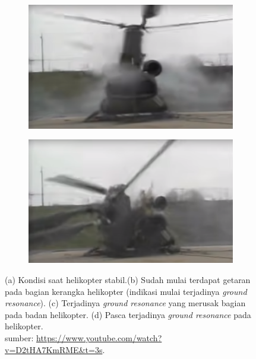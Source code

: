 \begin{figure}[H]
	\begin{subfigure}{0.4\textwidth}
		\centering
		\includegraphics[width=\linewidth]{gambar/gr_3.png}
		\caption{}
		\label{fig:gr_3}
	\end{subfigure}
	\centering
	\begin{subfigure}{0.4\textwidth}
		\centering
		\includegraphics[width=\linewidth]{gambar/gr_4.png}
		\caption{}
		\label{fig:gr_4}
	\end{subfigure}
		\caption{(a) Kondisi saat helikopter stabil.(b) Sudah mulai terdapat getaran pada bagian kerangka helikopter (indikasi mulai terjadinya \textit{ground resonance}). (c) Terjadinya \textit{ground resonance} yang merusak bagian pada badan helikopter. (d) Pasca terjadinya \textit{ground resonance} pada helikopter.\\
		sumber: \url{https://www.youtube.com/watch?v=D2tHA7KmRME&t=3s}.}
		\label{fig:gr}
\end{figure}


